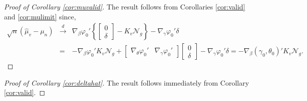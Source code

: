 \begin{proof}[Proof of Corollary \ref{cor:muvalid}]
The result follows from Corollaries \ref{cor:valid} and \ref{cor:mulimit} since,
	\begin{eqnarray*}
		\sqrt{n}\left( \widehat{\mu}_v - \mu_n\right) &\overset{d}{\rightarrow}&\nabla_\beta\varphi_0' \left\{ \left[\begin{array}{c} 0\\ \delta \end{array}\right] -K_v\mathscr{N}_g  \right\}-\nabla_\gamma \varphi_0' \delta\\ 
			&=& -\nabla_\beta\varphi_0' K_v\mathscr{N}_g + \left[\begin{array}{cc} \nabla_\theta\varphi_0'  & \nabla_\gamma\varphi_0' \end{array}\right]\left[\begin{array}{c} 0\\ \delta\end{array}\right]-\nabla_\gamma \varphi_0' \delta = -\nabla_\beta(\gamma_0,\theta_0)' K_v\mathscr{N}_g.
	\end{eqnarray*}
\end{proof}

\begin{proof}[Proof of Corollary \ref{cor:deltahat}]
  The result follows immediately from Corollary \ref{cor:valid}.
\end{proof}


